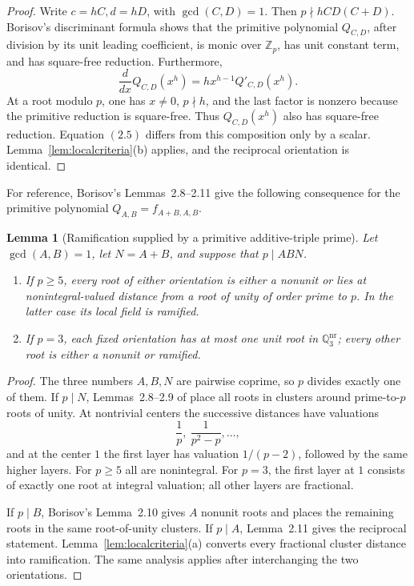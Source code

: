 \documentclass[11pt]{article}
\newtheorem{lemma}[theorem]{Lemma}
\theoremstyle{definition}
\newcommand{\Q}{\mathbb Q}
\newcommand{\Z}{\mathbb Z}
\begin{document}
\begin{proof}
Write \(c=hC,d=hD\), with \(\gcd(C,D)=1\).  Then
\(p\nmid hCD(C+D)\).  Borisov's discriminant formula
\cite[Lemma~2.1]{Borisov1998} shows that the primitive polynomial
\(Q_{C,D}\), after division by its unit leading coefficient, is monic over
\(\Z_p\), has unit constant term, and has square-free reduction.
Furthermore,
\[
 \frac{d}{dx}Q_{C,D}(x^h)=hx^{h-1}Q'_{C,D}(x^h).
\]
At a root modulo \(p\), one has \(x\neq0\), \(p\nmid h\), and the last
factor is nonzero because the primitive reduction is square-free.  Thus
\(Q_{C,D}(x^h)\) also has square-free reduction.  Equation \((2.5)\) differs
from this composition only by a scalar.  Lemma~\ref{lem:localcriteria}(b)
applies, and the reciprocal orientation is identical.
\end{proof}

For reference, Borisov's Lemmas~2.8--2.11 give the following consequence for
the primitive polynomial \(Q_{A,B}=f_{A+B,A,B}\).

\begin{lemma}[Ramification supplied by a primitive additive-triple prime]
\label{lem:borisovramification}
Let \(\gcd(A,B)=1\), let \(N=A+B\), and suppose that \(p\mid ABN\).
\begin{enumerate}[label=(\alph*)]
\item If \(p\geq5\), every root of either orientation is either a nonunit or
lies at nonintegral-valued distance from a root of unity of order prime to
\(p\).  In the latter case its local field is ramified.
\item If \(p=3\), each fixed orientation has at most one unit root in
\(\Q_3^{\mathrm{nr}}\); every other root is either a nonunit or ramified.
\end{enumerate}
\end{lemma}

\begin{proof}
The three numbers \(A,B,N\) are pairwise coprime, so \(p\) divides exactly
one of them.  If \(p\mid N\), Lemmas~2.8--2.9 of \cite{Borisov1998} place
all roots in clusters around prime-to-\(p\) roots of unity.  At nontrivial
centers the successive distances have valuations
\[
 \frac1p,\ \frac1{p^2-p},\ldots,
\]
and at the center \(1\) the first layer has valuation \(1/(p-2)\), followed
by the same higher layers.  For \(p\geq5\) all are nonintegral.  For
\(p=3\), the first layer at \(1\) consists of exactly one root at integral
valuation; all other layers are fractional.

If \(p\mid B\), Borisov's Lemma~2.10 gives \(A\) nonunit roots and places
the remaining roots in the same root-of-unity clusters.  If \(p\mid A\),
Lemma~2.11 gives the reciprocal statement.  Lemma~\ref{lem:localcriteria}(a)
converts every fractional cluster distance into ramification.  The same
analysis applies after interchanging the two orientations.
\end{proof}
\end{document}
